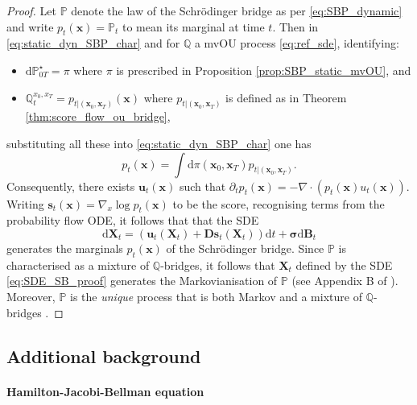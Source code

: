 \documentclass{article}
\newcommand{\diff}{\mathrm{d}}
\theoremstyle{newstyle}
\begin{document}
\begin{proof}
  Let $\mathbb{P}$ denote the law of the Schr\"odinger bridge as per \eqref{eq:SBP_dynamic} and write $p_t(\bm{x}) = \mathbb{P}_{t}$ to mean its marginal at time $t$. Then in \eqref{eq:static_dyn_SBP_char} and for $\mathbb{Q}$ a mvOU process \eqref{eq:ref_sde}, identifying:
  \begin{itemize}
  \item $\diff \mathbb{P}_{0T}^\star = \pi$ where $\pi$ is prescribed in Proposition \ref{prop:SBP_static_mvOU}, and
  \item $\mathbb{Q}^{x_0, x_T}_t = p_{t | (\bm{x}_0, \bm{x}_T)}(\bm{x})$ where $p_{t | (\bm{x}_0, \bm{x}_T)}$ is defined as in Theorem \ref{thm:score_flow_ou_bridge},
  \end{itemize}
  substituting all these into \eqref{eq:static_dyn_SBP_char} one has 
  \[
    p_{t}(\bm{x}) = \int \diff \pi(\bm{x}_0, \bm{x}_T) p_{t | (\bm{x}_0, \bm{x}_T)}. 
  \]
  Consequently, there exists $\bm{u}_t(\bm{x})$ such that $\partial_t p_t(\bm{x}) = -\nabla \cdot (p_t(\bm{x}) u_t(\bm{x}))$. Writing $\bm{s}_t(\bm{x}) = \nabla_x \log p_t(\bm{x})$ to be the score, recognising terms from the probability flow ODE, it follows that that the SDE 
  \begin{equation}
    \diff \bm{X}_t = (\bm{u}_t(\bm{X}_t) + \bm{D} \bm{s}_t(\bm{X}_t)) \diff t + \bm{\sigma} \diff \bm{B}_t \label{eq:SDE_SB_proof}
  \end{equation}
  generates the marginals $p_t(\bm{x})$ of the Schr\"odinger bridge. Since $\mathbb{P}$ is characterised as a mixture of $\mathbb{Q}$-bridges, it follows that $\bm{X}_t$ defined by the SDE \eqref{eq:SDE_SB_proof} generates the Markovianisation of $\mathbb{P}$ (see Appendix B of \cite{tong2023simulation}). Moreover, $\mathbb{P}$ is the \emph{unique} process that is both Markov and a mixture of $\mathbb{Q}$-bridges \cite{leonard2013survey, shi2023diffusion}. 
\end{proof}


\subsection{Additional background}

\paragraph{Hamilton-Jacobi-Bellman equation}
\end{document}
